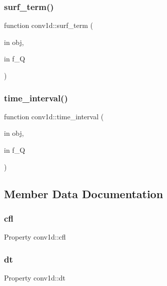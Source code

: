 \subsubsection{\texorpdfstring{surf\+\_\+term()}{surf\_term()}}
{\footnotesize\ttfamily function conv1d\+::surf\+\_\+term (\begin{DoxyParamCaption}\item[{in}]{obj,  }\item[{in}]{f\+\_\+Q }\end{DoxyParamCaption})}

\mbox{\label{classconv1d_a04d183892adfd894a63d6d47f9cf7ba5}} 
\subsubsection{\texorpdfstring{time\+\_\+interval()}{time\_interval()}}
{\footnotesize\ttfamily function conv1d\+::time\+\_\+interval (\begin{DoxyParamCaption}\item[{in}]{obj,  }\item[{in}]{f\+\_\+Q }\end{DoxyParamCaption})}



\subsection{Member Data Documentation}
\mbox{\label{classconv1d_a825a4733cc687e6bb21761db4fc18464}} 
\subsubsection{\texorpdfstring{cfl}{cfl}}
{\footnotesize\ttfamily Property conv1d\+::cfl\hspace{0.3cm}{\ttfamily [protected]}}

\mbox{\label{classconv1d_adf437888f16fbfd326f087077cf022d5}} 
\subsubsection{\texorpdfstring{dt}{dt}}
{\footnotesize\ttfamily Property conv1d\+::dt\hspace{0.3cm}{\ttfamily [protected]}}

